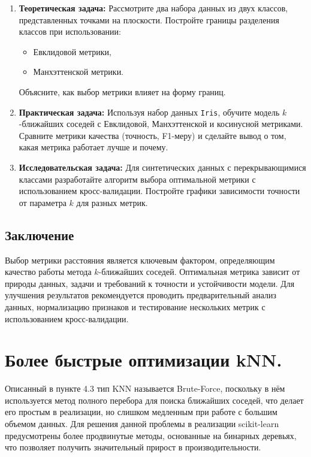 \begin{enumerate}
    \item \textbf{Теоретическая задача:}
    Рассмотрите два набора данных из двух классов, представленных точками на плоскости.
    Постройте границы разделения классов при использовании:
    \begin{itemize}
        \item Евклидовой метрики,
        \item Манхэттенской метрики.
    \end{itemize}
    Объясните, как выбор метрики влияет на форму границ.

    \item \textbf{Практическая задача:}
    Используя набор данных \texttt{Iris}, обучите модель \(k\)-ближайших соседей с Евклидовой, Манхэттенской и косинусной метриками. Сравните метрики качества (точность, F1-меру) и сделайте вывод о том, какая метрика работает лучше и почему.

    \item \textbf{Исследовательская задача:}
    Для синтетических данных с перекрывающимися классами разработайте алгоритм выбора оптимальной метрики с использованием кросс-валидации. Постройте графики зависимости точности от параметра \(k\) для разных метрик.
\end{enumerate}

\subsection{Заключение}

Выбор метрики расстояния является ключевым фактором, определяющим качество работы метода \(k\)-ближайших соседей. Оптимальная метрика зависит от природы данных, задачи и требований к точности и устойчивости модели. Для улучшения результатов рекомендуется проводить предварительный анализ данных, нормализацию признаков и тестирование нескольких метрик с использованием кросс-валидации.

\section{Более быстрые оптимизации kNN.}

Описанный в пункте 4.3 тип KNN называется Brute-Force, поскольку в нём используется метод полного перебора для поиска ближайших соседей, что делает его простым в реализации, но слишком медленным при работе с большим объемом данных. Для решения данной проблемы в реализации scikit-learn предусмотрены более продвинутые методы, основанные на бинарных деревьях, что позволяет получить значительный прирост в производительности.

